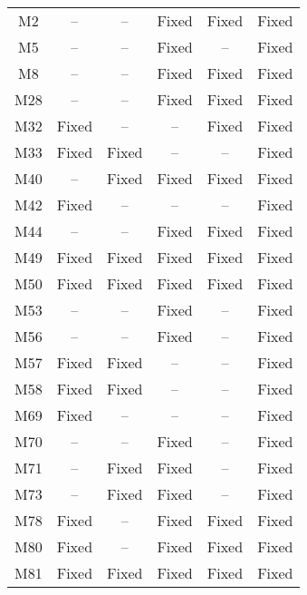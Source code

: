 \begin{table}[!t]
{\begin{tabular}{|c|c|c|c|c|c|}
\hline
M2                & --        & --        & Fixed     & Fixed     &Fixed   \\
M5                & --        & --        & Fixed     & --        &Fixed   \\
M8                & --        & --        & Fixed     & Fixed     &Fixed   \\
M28               & --        & --        & Fixed     & Fixed     &Fixed   \\
M32               & Fixed     & --        & --        & Fixed     &Fixed   \\
M33               & Fixed     & Fixed     & --        & --        &Fixed   \\
M40               & --        & Fixed     & Fixed     & Fixed     &Fixed   \\
M42               & Fixed     & --        & --        & --        &Fixed   \\
M44               & --        & --        & Fixed     & Fixed     &Fixed   \\
M49               & Fixed     & Fixed     & Fixed     & Fixed     &Fixed   \\
M50               & Fixed     & Fixed     & Fixed     & Fixed     &Fixed   \\
M53               & --        & --        & Fixed     & --        &Fixed   \\
M56               & --        & --        & Fixed     & --        &Fixed   \\
M57               & Fixed     & Fixed     & --        & --        &Fixed   \\
M58               & Fixed     & Fixed     & --        & --        &Fixed   \\
M69               & Fixed     & --        & --        & --        &Fixed   \\
M70               & --        & --        & Fixed     & --        &Fixed   \\
M71               & --        & Fixed     & Fixed     & --        &Fixed   \\
M73               & --        & Fixed     & Fixed     & --        &Fixed   \\
M78               & Fixed     & --        & Fixed     & Fixed     &Fixed   \\
M80               & Fixed     & --        & Fixed     & Fixed     &Fixed   \\
M81               & Fixed     & Fixed     & Fixed     & Fixed     &Fixed   \\

\end{tabular}}
\end{table}
